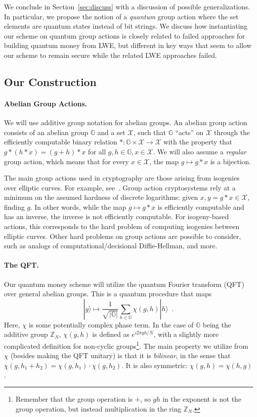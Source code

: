 \documentclass{article}\usepackage[a4paper,margin=20mm]{geometry}
\numberwithin{theorem}{section}
\numberwithin{equation}{section}
\newcommand{\Z}{\mathbb{Z}}
\newcommand{\G}{\mathbb{G}}
\newcommand{\Xs}{{\mathcal{X}}}
\begin{document}
We conclude in Section~\ref{sec:discuss} with a discussion of possible generalizations. In particular, we propose the notion of a \emph{quantum} group action where the set elements are quantum states instead of bit strings. We discuss how instantiating our scheme on quantum group actions is closely related to failed approaches for building quantum money from LWE, but different in key ways that seem to allow our scheme to remain secure while the related LWE approaches failed.

\subsection{Our Construction}\label{sec:constroverview}

\paragraph{Abelian Group Actions.} We will use additive group notation for abelian groups. An abelian group action consists of an abelian group $\G$ and a set $\Xs$, such that $\G$ ``acts'' on $\Xs$ through the efficiently computable binary relation $*:\G\times\Xs\rightarrow\Xs$ with the property that $g*(h*x)=(g+h)*x$ for all $g,h\in\G,x\in\Xs$. We will also assume a \emph{regular} group action, which means that for every $x\in\Xs$, the map $g\mapsto g*x$ is a bijection. 

The main group actions used in cryptography are those arising from isogenies over elliptic curves. For example, see~\cite{EPRINT:Couveignes06,EPRINT:RosSto06,AC:CLMPR18,AC:BeuKleVer19,PKC:DFKLMP23}. %
Group action cryptosystems rely at a minimum on the assumed hardness of discrete logarithms: given $x,y=g*x\in\Xs$, finding $g$. In other words, while the map $g\mapsto g*x$ is efficiently computable and has an inverse, the inverse is not efficiently computable. For isogeny-based actions, this corresponds to the hard problem of computing isogenies between elliptic curves. Other hard problems on group actions are possible to consider, such as analogs of computational/decisional Diffie-Hellman, and more.



\paragraph{The QFT.} Our quantum money scheme will utilize the quantum Fourier transform (QFT) over general abelian groups. This is a quantum procedure that maps
\[|g\rangle\mapsto\frac{1}{\sqrt{|\G|}}\sum_{h\in\G}\chi(g,h)|h\rangle\enspace .\]
Here, $\chi$ is some potentially complex phase term. In the case of $\G$ being the additive group $\Z_N$, $\chi(g,h)$ is defined as $e^{i2\pi gh/N}$, with a slightly more complicated definition for non-cyclic groups\footnote{Remember that the group operation is $+$, so $gh$ in the exponent is not the group operation, but instead multiplication in the ring $\Z_N$.}. The main property we utilize from $\chi$ (besides making the QFT unitary) is that it is \emph{bilinear}, in the sense that $\chi(g,h_1+ h_2)=\chi(g,h_1)\cdot\chi(g,h_2)$. It is also symmetric: $\chi(g,h)=\chi(h,g)$.
\end{document}
